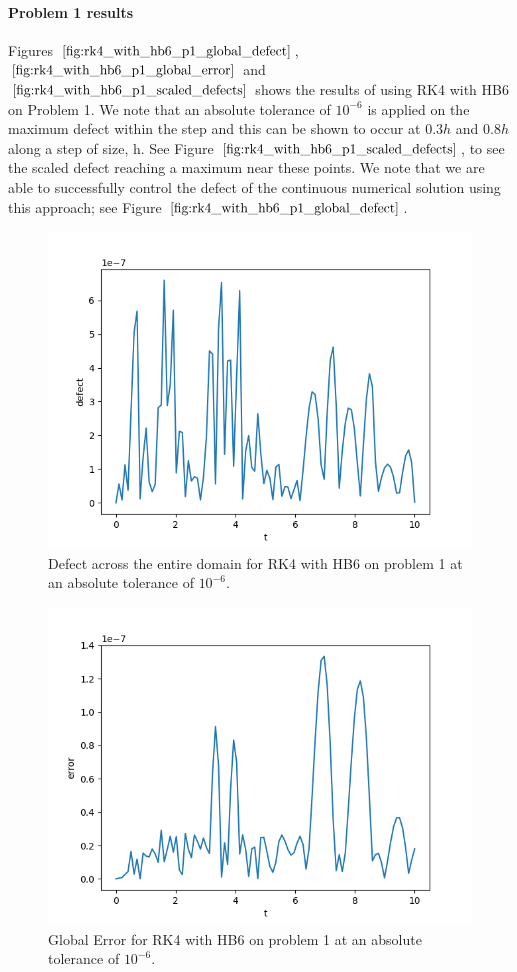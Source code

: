 \paragraph{Problem 1 results}
Figures $\ref{fig:rk4_with_hb6_p1_global_defect}$, $\ref{fig:rk4_with_hb6_p1_global_error}$ and $\ref{fig:rk4_with_hb6_p1_scaled_defects}$ shows the results of using RK4 with HB6 on Problem 1. We note that an absolute tolerance of $10^{-6}$ is applied on the maximum defect within the step and this can be shown to occur at $0.3h$ and $0.8h$ along a step of size, h. See Figure $\ref{fig:rk4_with_hb6_p1_scaled_defects}$, to see the scaled defect reaching a maximum near these points. We note that we are able to successfully control the defect of the continuous numerical solution using this approach; see Figure $\ref{fig:rk4_with_hb6_p1_global_defect}$. 

\begin{figure}[H]
\centering
\includegraphics[width=0.7\linewidth]{./figures/rk4_with_hb6_p1_global_defect}
\caption{Defect across the entire domain for RK4 with HB6 on problem 1 at an absolute tolerance of $10^{-6}$.}
\label{fig:rk4_with_hb6_p1_global_defect}
\end{figure}

\begin{figure}[H]
\centering
\includegraphics[width=0.7\linewidth]{./figures/rk4_with_hb6_p1_global_error}
\caption{Global Error for RK4 with HB6 on problem 1 at an absolute tolerance of $10^{-6}$.}
\label{fig:rk4_with_hb6_p1_global_error}
\end{figure}

